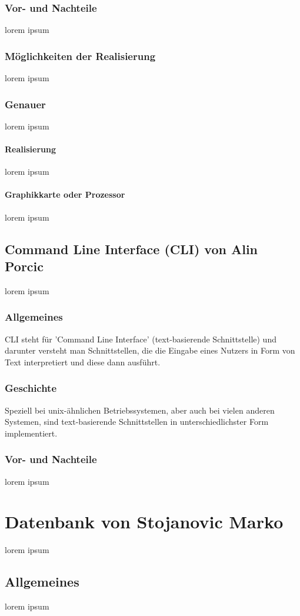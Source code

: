 \documentclass[12pt,a4paper]{report}
\begin{document}
\subsubsection{Vor- und Nachteile}
lorem ipsum
\subsubsection{Möglichkeiten der Realisierung}
lorem ipsum
\subsubsection{Genauer}
lorem ipsum
\paragraph{Realisierung}
lorem ipsum
\paragraph{Graphikkarte oder Prozessor}
lorem ipsum
\subsection{Command Line Interface (CLI) von Alin Porcic}
lorem ipsum
\subsubsection{Allgemeines}

CLI steht für 'Command Line Interface' (text-basierende Schnittstelle) und darunter versteht man Schnittstellen, die die Eingabe eines Nutzers in Form von Text interpretiert und diese dann ausführt.

\subsubsection{Geschichte}

Speziell bei unix-ähnlichen Betriebssystemen, aber auch bei vielen anderen Systemen, sind text-basierende Schnittstellen in unterschiedlichster Form implementiert.

\subsubsection{Vor- und Nachteile}
lorem ipsum
\section{Datenbank von Stojanovic Marko}
lorem ipsum
\subsection{Allgemeines}
lorem ipsum
\end{document}
